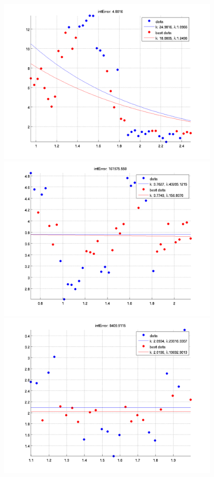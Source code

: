 \documentclass[12pt]{report}
\begin{document}
\begin{figure}[H]
\begin{minipage}[t]{0.5\linewidth}
	\centering
	\includegraphics[scale=\imFeatBW]{images/worst1}\\
	\includegraphics[scale=\imFeatBW]{images/worst3}\\
	\includegraphics[scale=\imFeatBW]{images/worst5}\\

\end{minipage}
\end{figure}
\end{document}

